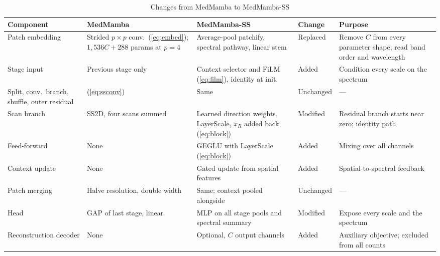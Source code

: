 \documentclass{svproc}
\begin{document}
\begin{table}[!htb]
\caption{Changes from MedMamba to MedMamba-SS}
\label{tab:chg-ss}
\centering\scriptsize
\setlength{\tabcolsep}{3pt}
\begin{tabular}{@{}L{1.9cm}L{2.4cm}L{3.0cm}L{1.4cm}L{2.55cm}@{}}
\toprule
Component & MedMamba~\cite{medmamba} & MedMamba-SS & Change & Purpose \\
\midrule
Patch embedding & Strided $p\times p$ conv.\ (\ref{eq:embed}); $1{,}536C + 288$ params at $p = 4$ & Average-pool patchify, spectral pathway, linear stem & Replaced & Remove $C$ from every parameter shape; read band order and wavelength \\
Stage input & Previous stage only & Context selector and FiLM (\ref{eq:film}), identity at init. & Added & Condition every scale on the spectrum \\
Split, conv.\ branch, shuffle, outer residual & (\ref{eq:ssconv}) & Same & Unchanged & --- \\
Scan branch & SS2D, four scans summed & Learned direction weights, LayerScale, $x_R$ added back (\ref{eq:block}) & Modified & Residual branch starts near zero; identity path \\
Feed-forward & None & GEGLU with LayerScale (\ref{eq:block}) & Added & Mixing over all channels \\
Context update & None & Gated update from spatial features & Added & Spatial-to-spectral feedback \\
Patch merging & Halve resolution, double width & Same; context pooled alongside & Unchanged & --- \\
Head & GAP of last stage, linear & MLP on all stage pools and spectral summary & Modified & Expose every scale and the spectrum \\
Reconstruction decoder & None & Optional, $C$ output channels & Added & Auxiliary objective; excluded from all counts \\
\bottomrule
\end{tabular}
\end{table}
\end{document}
